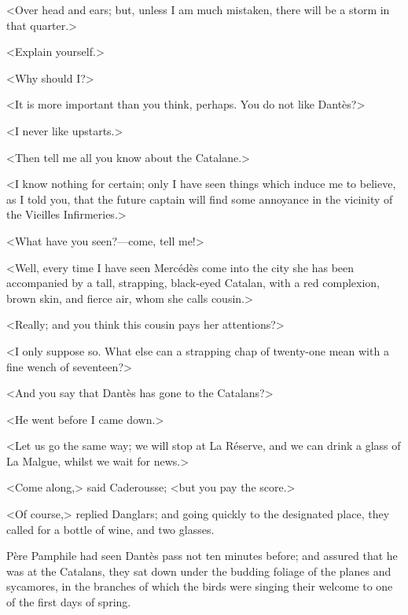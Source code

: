  <Over head and ears; but, unless I am much mistaken, there will be a storm in that quarter.>  
 
 <Explain yourself.> 

 <Why should I\@?> 

 <It is more important than you think, perhaps. You do not like Dantès?> 

 <I never like upstarts.> 

 <Then tell me all you know about the Catalane.> 

 <I know nothing for certain; only I have seen things which induce me to believe, as I told you, that the future captain will find some annoyance in the vicinity of the Vieilles Infirmeries.> 

 <What have you seen?—come, tell me!> 

 <Well, every time I have seen Mercédès come into the city she has been accompanied by a tall, strapping, black-eyed Catalan, with a red complexion, brown skin, and fierce air, whom she calls cousin.> 

 <Really; and you think this cousin pays her attentions?> 

 <I only suppose so. What else can a strapping chap of twenty-one mean with a fine wench of seventeen?> 

 <And you say that Dantès has gone to the Catalans?> 

 <He went before I came down.> 

 <Let us go the same way; we will stop at La Réserve, and we can drink a glass of La Malgue, whilst we wait for news.> 

 <Come along,> said Caderousse; <but you pay the score.> 

 <Of course,> replied Danglars; and going quickly to the designated place, they called for a bottle of wine, and two glasses. 

 Père Pamphile had seen Dantès pass not ten minutes before; and assured that he was at the Catalans, they sat down under the budding foliage of the planes and sycamores, in the branches of which the birds were singing their welcome to one of the first days of spring. 